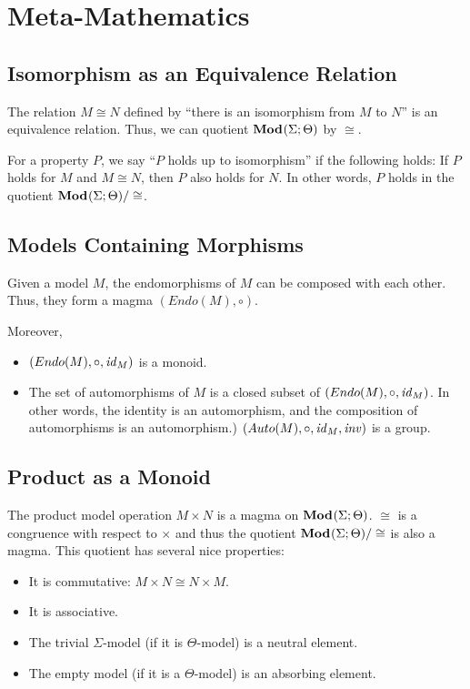 
\section{Meta-Mathematics}\label{sec:univ:meta}

\subsection{Isomorphism as an Equivalence Relation}

The relation $M\cong N$ defined by ``there is an isomorphism from $M$ to $N$'' is an equivalence relation.
Thus, we can quotient ${\mathbf{Mod}^{}}(\Sigma;\Theta)$ by $\cong$.

For a property $P$, we say ``$P$ holds up to isomorphism'' if the following holds: If $P$ holds for $M$ and $M\cong N$, then $P$ also holds for $N$.
In other words, $P$ holds in the quotient ${\mathbf{Mod}^{}}(\Sigma;\Theta)/\cong$.

\subsection{Models Containing Morphisms}

Given a model $M$, the endomorphisms of $M$ can be composed with each other.
Thus, they form a magma $(Endo(M),\circ)$.

Moreover,
\begin{itemize}
\item $(Endo(M),\circ, \mathit{id}_{M})$ is a monoid.
\item The set of automorphisms of $M$ is a closed subset of $(Endo(M),\circ, \mathit{id}_{M})$.
In other words, the identity is an automorphism, and the composition of automorphisms is an automorphism.)
$(Auto(M),\circ, \mathit{id}_{M},\mathit{inv})$ is a group.
\end{itemize}

\subsection{Product as a Monoid}

The product model operation $M\times N$ is a magma on ${\mathbf{Mod}^{}}(\Sigma;\Theta)$.
$\cong$ is a congruence with respect to $\times$ and thus the quotient ${\mathbf{Mod}^{}}(\Sigma;\Theta)/\cong$ is also a magma.
This quotient has several nice properties:
\begin{itemize}
 \item It is commutative: $M\times N\cong N\times M$.
 \item It is associative.
 \item The trivial $\Sigma$-model (if it is $\Theta$-model) is a neutral element.
 \item The empty model (if it is a $\Theta$-model) is an absorbing element.
\end{itemize}

